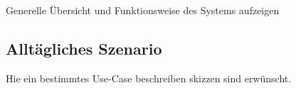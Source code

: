 Generelle Übersicht und Funktionsweise des Systems aufzeigen


\subsection{Alltägliches Szenario}
Hie ein bestimmtes Use-Case beschreiben skizzen sind erwünscht.